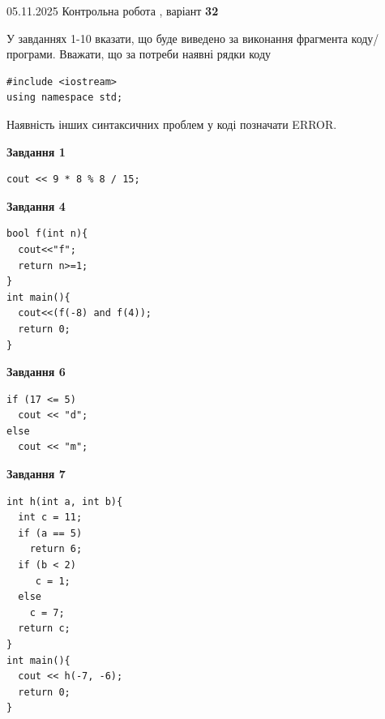 \documentclass[12pt, ukrainian]{article}
\begin{document}
{\Large{05.11.2025 Контрольна робота , варіант  \No \textbf { 32 }\par}}
{
\begin {large}
У завданнях 1-10 вказати, що буде виведено за виконання фрагмента коду/про\-гра\-ми.
Вважати, що за потреби наявні рядки коду
\begin{verbatim}
#include <iostream>
using namespace std;
\end{verbatim}
Наявність інших синтаксичних проблем у коді позначати ERROR.

\begin{minipage}[t]{7.0cm}

\begin{center}
\textbf{Завдання 1}
\end{center}
\vspace{-8mm}

\begin{verbatim}
cout << 9 * 8 % 8 / 15;
\end{verbatim}



\begin{center}
\textbf{Завдання 4}
\end{center}
\vspace{-8mm}

\begin{verbatim}
bool f(int n){
  cout<<"f";
  return n>=1;
}
int main(){
  cout<<(f(-8) and f(4));
  return 0;
}
\end{verbatim}



\begin{center}
\textbf{Завдання 6}
\end{center}
\vspace{-8mm}

\begin{verbatim}
if (17 <= 5)
  cout << "d";
else
  cout << "m";
\end{verbatim}



\begin{center}
\textbf{Завдання 7}
\end{center}
\vspace{-8mm}

\begin{verbatim}
int h(int a, int b){
  int c = 11;
  if (a == 5)
    return 6;
  if (b < 2)
     c = 1;
  else
    c = 7;
  return c;
}
int main(){
  cout << h(-7, -6);
  return 0;
}
\end{verbatim}


\end{minipage}
\end{large}}
\end{document}
